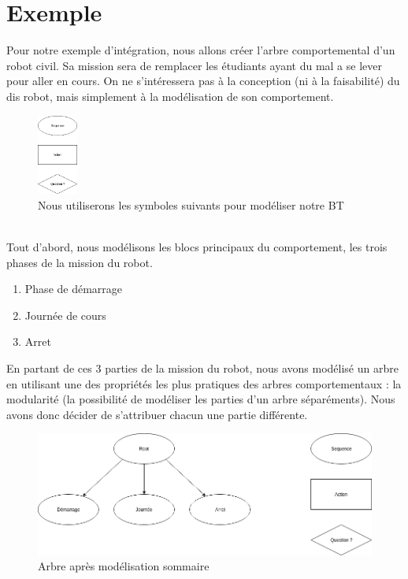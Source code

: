 \documentclass[titlepage]{article}
\begin{document}
	\section{Exemple}
	Pour notre exemple d'intégration, nous allons créer l'arbre comportemental d'un robot civil. Sa mission sera de remplacer les étudiants ayant du mal a se lever pour aller en cours. On ne s'intéressera pas à la conception (ni à la faisabilité) du dis robot, mais simplement à la modélisation de son comportement. 
	\\
	\begin{figure}[h!]
		\centering
		\includegraphics[width=50px]{img/BT_1.png}
		\caption{Nous utiliserons les symboles suivants pour modéliser notre BT}
		\label{fig:exemple_1}
	\end{figure}
	\\
	Tout d'abord, nous modélisons les blocs principaux du comportement, les trois phases de la mission du robot.
	\begin{enumerate}
		\item Phase de démarrage
		\item Journée de cours
		\item Arret
	\end{enumerate}
	En partant de ces 3 parties de la mission du robot, nous avons modélisé un arbre en utilisant une des propriétés les plus pratiques des arbres comportementaux : la modularité (la possibilité de modéliser les parties d'un arbre séparéments). \cite{iliffe_andrea_marlow_rachel_phillips_alexander_petter_2018}
	Nous avons donc décider de s'attribuer chacun une partie différente.
	\\
	\begin{figure}[h!]
		\centering
		\includegraphics[width=\linewidth]{img/BT_2.png}
		\caption{Arbre après modélisation sommaire}
		\label{fig:exemple_2}
	\end{figure}
	\\
\end{document}
